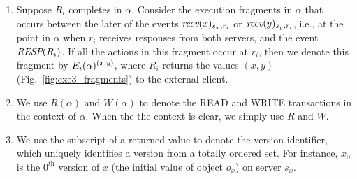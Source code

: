 \begin{enumerate}[leftmargin=*]

\item Suppose \rot{} $R_i$  completes in $\alpha$. Consider the execution fragments in $\alpha$ that
occurs between the later of the events   ${\textit{recv}(x)_{ s_x, r_i}}$ or  ${\textit{recv}(y)_{s_y, r_i}}$, i.e., at the point in $\alpha$ when $r_i$ receives responses from both servers,  and the event ${\textit{RESP}(R_i)}$. If all the 
actions in this fragment occur at $r_i$, then we denote this fragment by $\frage{E_i}{\alpha}{x, y}$, where $R_i$ returns the values $(x, y)$  (Fig.~\ref{fig:exe3_fragments}) to the external client.  %

\item We use $R(\alpha)$ and $W(\alpha)$ to denote the READ and WRITE transactions in the context of $\alpha$. When the the context is clear, we simply use $R$ and $W$.
\item We use the subscript of a returned value to denote the version identifier, which uniquely identifies a version from a totally ordered set. For instance, $x_0$ is the $0^{\textit{th}}$ version of $x$ (the initial value of object $o_x$) on server $s_x$.

\end{enumerate}

